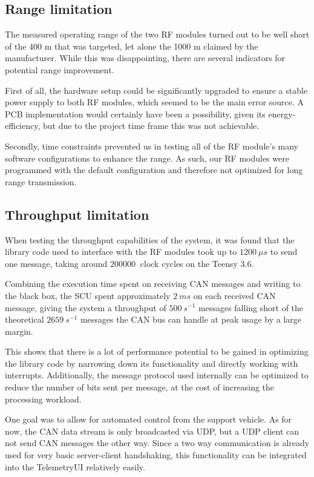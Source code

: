 \documentclass[a4paper,conference]{IEEEtran}
\begin{document}
\subsection{Range limitation}
The measured operating range of the two RF modules turned out to be well short of the 400 m that was targeted, let alone the 1000 m claimed by the manufacturer. While this was disappointing, there are several indicators for potential range improvement. 

First of all, the hardware setup could be significantly upgraded to ensure a stable power supply to both RF modules, which seemed to be the main error source. A PCB implementation would certainly have been a possibility, given its energy-efficiency, but due to the project time frame this was not achievable. 

Secondly, time constraints prevented us in testing all of the RF module's many software configurations to enhance the range. As such, our RF modules were programmed with the default configuration and therefore not optimized for long range transmission. 

\subsection{Throughput limitation}
When testing the throughput capabilities of the system, it was found that the library code used to interface with the RF modules took up to $\SI{1200}{\mu s}$ to send one message, taking around $\SI{200000}{}$ clock cycles on the Teensy 3.6.

Combining the execution time spent on receiving CAN messages and writing to the black box, the SCU spent approximately $\SI{2}{ms}$ on each received CAN message, giving the system a throughput of $\SI{500}{s^{-1}}$ messages falling short of the theoretical $\SI{2659}{s^{-1}}$ messages the CAN bus can handle at peak usage by a large margin.

This shows that there is a lot of performance potential to be gained in optimizing the library code by narrowing down its functionality and directly working with interrupts. Additionally, the message protocol used internally can be optimized to reduce the number of bits sent per message, at the cost of increasing the processing workload.

One goal was to allow for automated control from the support vehicle. As for now, the CAN data stream is only broadcasted via UDP, but a UDP client can not send CAN messages the other way. Since a two way communication is already used for very basic server-client handshaking, this functionality can be integrated into the TelemetryUI relatively easily.
\end{document}
